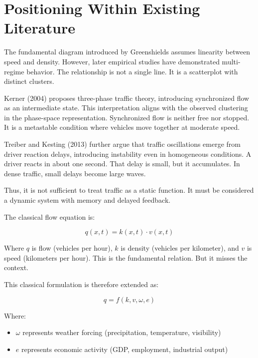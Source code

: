 \documentclass[12pt]{article}
\begin{document}
\section{Positioning Within Existing Literature}

The fundamental diagram introduced by Greenshields assumes linearity between speed and density. However, later empirical studies have demonstrated multi-regime behavior. The relationship is not a single line. It is a scatterplot with distinct clusters.

Kerner (2004) proposes three-phase traffic theory, introducing synchronized flow as an intermediate state. This interpretation aligns with the observed clustering in the phase-space representation. Synchronized flow is neither free nor stopped. It is a metastable condition where vehicles move together at moderate speed.

Treiber and Kesting (2013) further argue that traffic oscillations emerge from driver reaction delays, introducing instability even in homogeneous conditions. A driver reacts in about one second. That delay is small, but it accumulates. In dense traffic, small delays become large waves.

Thus, it is not sufficient to treat traffic as a static function. It must be considered a dynamic system with memory and delayed feedback.

The classical flow equation is:

\begin{equation}
q(x,t) = k(x,t) \cdot v(x,t)
\end{equation}

Where \(q\) is flow (vehicles per hour), \(k\) is density (vehicles per kilometer), and \(v\) is speed (kilometers per hour). This is the fundamental relation. But it misses the context.

This classical formulation is therefore extended as:

\begin{equation}
q = f(k, v, \omega, e)
\end{equation}

Where:
\begin{itemize}
\item \(\omega\) represents weather forcing (precipitation, temperature, visibility)
\item \(e\) represents economic activity (GDP, employment, industrial output)
\end{itemize}
\end{document}
